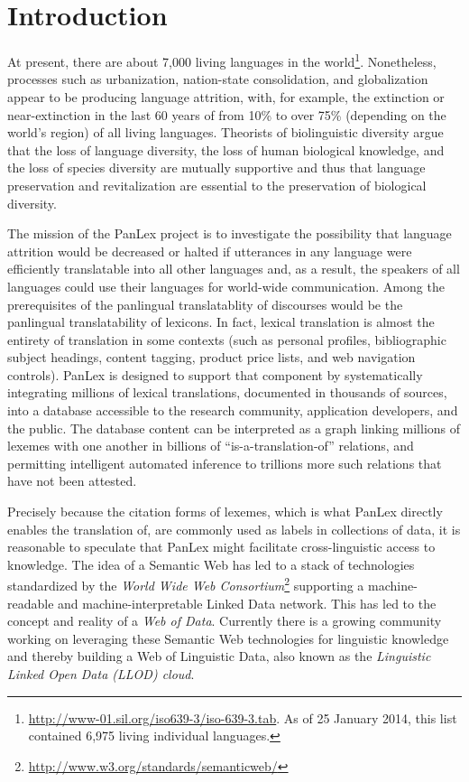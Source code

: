 \documentclass[sw]{iosart2c}
\begin{document}
\section{Introduction}
\label{sec:intro}
At present, there are about 7,000 living languages in the world\footnote{\url{http://www-01.sil.org/iso639-3/iso-639-3.tab}. As of 25 January 2014, this list contained 6,975 living individual languages.}.
Nonetheless, processes such as urbanization, nation-state consolidation, and globalization appear to be producing language attrition, with, for example, the extinction or near-extinction in the last 60 years of from 10\% to over 75\% (depending on the world's region) of all living languages\cite{lang_crisis}.
Theorists of biolinguistic diversity argue that the loss of language diversity, the loss of human biological knowledge, and the loss of species diversity are mutually supportive and thus that language preservation and revitalization are essential to the preservation of biological diversity\cite{nettle}.

The mission of the PanLex project is to investigate the possibility that language attrition would be decreased or halted if utterances in any language were efficiently translatable into all other languages and, as a result, the speakers of all languages could use their languages for world-wide communication. Among the prerequisites of the panlingual translatablity of discourses would be the panlingual translatability of lexicons. In fact, lexical translation is almost the entirety of translation in some contexts (such as personal profiles, bibliographic subject headings, content tagging, product price lists, and web navigation controls). PanLex is designed to support that component by systematically integrating millions of lexical translations, documented in thousands of sources, into a database accessible to the research community, application developers, and the public. The database content can be interpreted as a graph linking millions of lexemes with one another in billions of ``is-a-translation-of'' relations, and permitting intelligent automated inference to trillions more such relations that have not been attested.

Precisely because the citation forms of lexemes, which is what PanLex directly enables the translation of, are commonly used as labels in collections of data, it is reasonable to speculate that PanLex might facilitate cross-linguistic access to knowledge. The idea of a Semantic Web has led to a stack of technologies standardized by the
\emph{World Wide Web Consortium}\footnote{\url{http://www.w3.org/standards/semanticweb/}}
supporting a machine-readable and machine-interpretable Linked Data
network. This has led to the concept and reality of a \emph{Web of Data}.
Currently there is a growing community working on leveraging these Semantic Web
technologies for linguistic knowledge and thereby building a Web of Linguistic
Data, also known as the \emph{Linguistic Linked Open Data (LLOD) cloud}.
\end{document}
